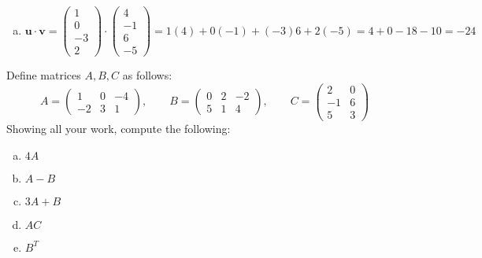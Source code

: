 \documentclass[11pt,letterpaper]{article}
\begin{document}
\begin{enumerate}[(a)]
\item 
	\[
	\mathbf{u} \cdot \mathbf{v}= \begin{pmatrix} 1 \\ 0 \\ -3 \\ 2 \end{pmatrix} \cdot \begin{pmatrix} 4 \\ -1 \\ 6 \\ -5 \end{pmatrix}= 1(4) + 0(-1) + (-3)6 + 2(-5)= 4 + 0 - 18 - 10= -24
	\]
\end{enumerate}



\newpage



 Define matrices $A, B, C$ as follows:
	\[
	A= \begin{pmatrix} 1 & 0 & -4 \\ -2 & 3 & 1 \end{pmatrix}, \qquad B= \begin{pmatrix} 0 & 2 & -2 \\ 5 & 1 & 4 \end{pmatrix}, \qquad C= \begin{pmatrix} 2 & 0 \\ -1 & 6 \\ 5 & 3 \end{pmatrix}
	\]
Showing all your work, compute the following:
	\begin{enumerate}[(a)]
	\item $4A$
	\item $A - B$
	\item $3A + B$
	\item $AC$
	\item $B^T$
	\end{enumerate} \pspace
\end{document}
